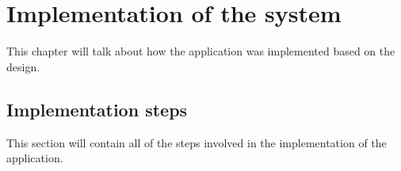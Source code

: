 \chapter{Implementation of the system}
This chapter will talk about how the application was implemented based on the design.

\section{Implementation steps}
This section will contain all of the steps involved in the implementation of the application.